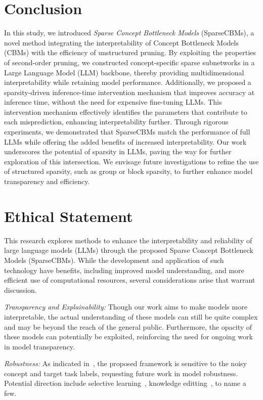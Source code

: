 \documentclass[letterpaper]{article} %
\begin{document}
\section{Conclusion}
In this study, we introduced \textit{Sparse Concept Bottleneck Models} (SparseCBMs), a novel method integrating the interpretability of Concept Bottleneck Models (CBMs) with the efficiency of unstructured pruning. By exploiting the properties of second-order pruning, we constructed concept-specific sparse subnetworks in a Large Language Model (LLM) backbone, thereby providing multidimensional interpretability while retaining model performance.
Additionally, we proposed a sparsity-driven inference-time intervention mechanism that improves accuracy at inference time, without the need for expensive fine-tuning LLMs. This intervention mechanism effectively identifies the parameters that contribute to each misprediction, enhancing interpretability further.
Through rigorous experiments, we demonstrated that SparseCBMs match the performance of full LLMs while offering the added benefits of increased interpretability. Our work underscores the potential of sparsity in LLMs, paving the way for further exploration of this intersection. We envisage future investigations to refine the use of structured sparsity, such as group or block sparsity, to further enhance model transparency and efficiency.





\section*{Ethical Statement}
This research explores methods to enhance the interpretability and reliability of large language models (LLMs) through the proposed Sparse Concept Bottleneck Models (SparseCBMs). While the development and application of such technology have benefits, including improved model understanding, and more efficient use of computational resources, several considerations arise that warrant discussion.

\textit{Transparency and Explainability:} Though our work aims to make models more interpretable, the actual understanding of these models can still be quite complex and may be beyond the reach of the general public. Furthermore, the opacity of these models can potentially be exploited, reinforcing the need for ongoing work in model transparency.

\textit{Robustness:} As indicated in~\citep{tan2023cbm,wang2023noise}, the proposed framework is sensitive to the noisy concept and target task labels, requesting future work in model robustness. Potential direction include selective learning~\citep{li2023disc,li2023csgnn}, knowledge editting~\citep{wang2023knowledge}, to name a few.
\end{document}
